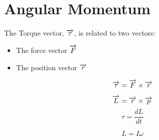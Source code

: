 \chapter{Angular Momentum}

    \par The Torque vector, $\overrightarrow{\tau}$, is related to two vectors:
    \begin{itemize}
        \item The force vector $\overrightarrow{F}$
        \item The position vector $\overrightarrow{r}$
    \end{itemize}
    \begin{equation}
        \overrightarrow{\tau} = \overrightarrow{F} \times \overrightarrow{r}
    \end{equation}

        \begin{equation}
            \overrightarrow{L} = \overrightarrow{r} \times \overrightarrow{p}
        \end{equation}
    \begin{equation}
        \tau = \dfrac{dL}{dt}
    \end{equation}

    \begin{equation}
        L = I \omega
    \end{equation}
